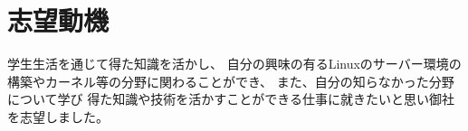 \documentclass{jsarticle}
\begin{document}
\section*{志望動機}
学生生活を通じて得た知識を活かし、
自分の興味の有るLinuxのサーバー環境の構築やカーネル等の分野に関わることができ、
また、自分の知らなかった分野について学び
得た知識や技術を活かすことができる仕事に就きたいと思い御社を志望しました。
\end{document}
